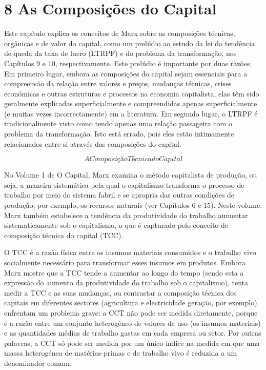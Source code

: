 \chapter{8 As Composições do Capital}\label{8 As Composições do Capital}
 \par 
Este capítulo explica os conceitos de Marx sobre as composições técnicas, orgânicas e de valor do capital, como um prelúdio ao estudo da lei da tendência de queda da taxa de lucro (LTRPF) e do problema da transformação, nos Capítulos {\color{blue}9} e 10, respectivamente. Este prelúdio é importante por duas razões. Em primeiro lugar, embora as composições do capital sejam essenciais para a compreensão da relação entre valores e preços, mudanças técnicas, crises económicas e outras estruturas e processos na economia capitalista, elas têm sido geralmente explicadas superficialmente e compreendidas apenas superficialmente (e muitas vezes incorrectamente) em a literatura. Em segundo lugar, o LTRPF é tradicionalmente visto como tendo apenas uma relação passageira com o problema da transformação. Isto está errado, pois eles estão intimamente relacionados entre si através das composições do capital.
 \par 
\[A Composição Técnica do Capital\]
 \par 
No Volume {\color{blue}1} de O Capital, Marx examina o método capitalista de produção, ou seja, a maneira sistemática pela qual o capitalismo transforma o processo de trabalho por meio do sistema fabril e se apropria das outras condições de produção, por exemplo, os recursos naturais (ver Capítulos {\color{blue}6} e {\color{blue}15}). Neste volume, Marx também estabelece a tendência da produtividade do trabalho aumentar sistematicamente sob o capitalismo, o que é capturado pelo conceito de composição técnica do capital (TCC).
 \par 
O TCC é a razão física entre os insumos materiais consumidos e o trabalho vivo socialmente necessário para transformar esses insumos em produtos. Embora Marx mostre que a TCC tende a aumentar ao longo do tempo (sendo esta a expressão do aumento da produtividade do trabalho sob o capitalismo), tenta medir a TCC e as suas mudanças, ou contrastar a composição técnica dos capitais em diferentes sectores (agricultura e electricidade geração, por exemplo) enfrentam um problema grave: a CCT não pode ser medida diretamente, porque é a razão entre um conjunto heterogêneo de valores de uso (os insumos materiais) e as quantidades médias de trabalho gastas em cada empresa ou setor. Por outras palavras, a CCT só pode ser medida por um único índice na medida em que uma massa heterogénea de matérias-primas e de trabalho vivo é reduzida a um denominador comum.
